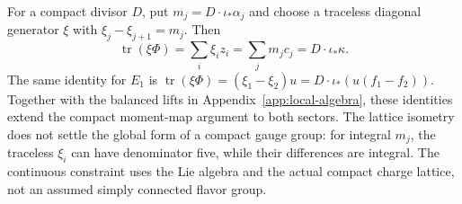 For a compact divisor $D$, put $m_j=D\cdot\iota_*\alpha_j$ and choose
a traceless diagonal generator $\xi$ with
$\xi_j-\xi_{j+1}=m_j$. Then
\begin{equation}
 \operatorname{tr}(\xi\Phi)=\sum_i\xi_i z_i
 =\sum_jm_jc_j=D\cdot\iota_*\kappa.
 \label{eq:e4-gauging-pairing}
\end{equation}
The same identity for $E_1$ is
$\operatorname{tr}(\xi\Phi)=(\xi_1-\xi_2)u
 =D\cdot\iota_*(u(f_1-f_2))$.
Together with the balanced lifts in Appendix~\ref{app:local-algebra},
these identities extend the compact moment-map argument to both sectors.
The lattice isometry does not settle the global form of a compact gauge
group: for integral $m_j$, the traceless $\xi_i$ can have denominator
five, while their differences are integral. The continuous constraint
uses the Lie algebra and the actual compact charge lattice, not an
assumed simply connected flavor group.
